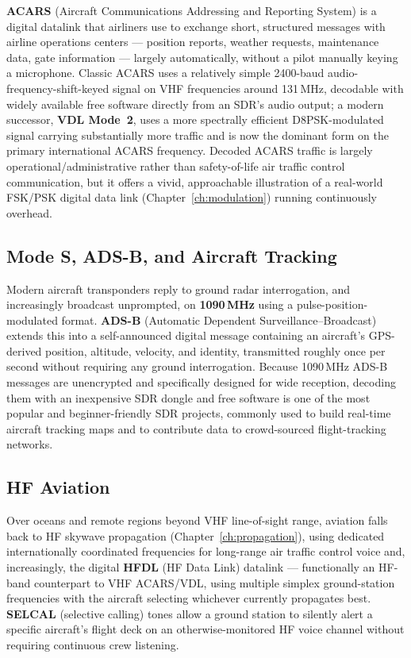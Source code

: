 \textbf{ACARS} (Aircraft Communications Addressing and Reporting
System) is a digital datalink that airliners use to exchange short,
structured messages with airline operations centers --- position
reports, weather requests, maintenance data, gate information --- largely
automatically, without a pilot manually keying a microphone. Classic
ACARS uses a relatively simple 2400-baud audio-frequency-shift-keyed
signal on VHF frequencies around 131\,MHz, decodable with widely
available free software directly from an SDR's audio output; a modern
successor, \textbf{VDL Mode~2}, uses a more spectrally efficient
D8PSK-modulated signal carrying substantially more traffic and is now
the dominant form on the primary international ACARS frequency.
Decoded ACARS traffic is largely operational/administrative rather than
safety-of-life air traffic control communication, but it offers a vivid,
approachable illustration of a real-world FSK/PSK digital data link
(Chapter~\ref{ch:modulation}) running continuously overhead.

\subsection{Mode S, ADS-B, and Aircraft Tracking}

Modern aircraft transponders reply to ground radar interrogation, and
increasingly broadcast unprompted, on \textbf{1090\,MHz} using a
pulse-position-modulated format. \textbf{ADS-B} (Automatic Dependent
Surveillance--Broadcast) extends this into a self-announced digital
message containing an aircraft's GPS-derived position, altitude,
velocity, and identity, transmitted roughly once per second without
requiring any ground interrogation. Because 1090\,MHz ADS-B messages are
unencrypted and specifically designed for wide reception, decoding them
with an inexpensive SDR dongle and free software is one of the most
popular and beginner-friendly SDR projects, commonly used to build
real-time aircraft tracking maps and to contribute data to
crowd-sourced flight-tracking networks.

\subsection{HF Aviation}

Over oceans and remote regions beyond VHF line-of-sight range,
aviation falls back to HF skywave propagation
(Chapter~\ref{ch:propagation}), using dedicated internationally
coordinated frequencies for long-range air traffic control voice and,
increasingly, the digital \textbf{HFDL} (HF Data Link) datalink ---
functionally an HF-band counterpart to VHF ACARS/VDL, using multiple
simplex ground-station frequencies with the aircraft selecting whichever
currently propagates best. \textbf{SELCAL} (selective calling) tones
allow a ground station to silently alert a specific aircraft's flight
deck on an otherwise-monitored HF voice channel without requiring
continuous crew listening.

